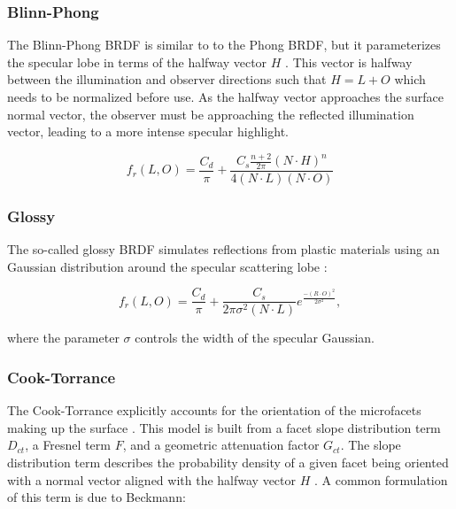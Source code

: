 \subsubsection{Blinn-Phong}

The Blinn-Phong BRDF is similar to to the Phong BRDF, but it parameterizes the specular lobe in terms of the halfway vector $H$ \cite{duvenhage2013}. This vector is halfway between the illumination and observer directions such that $H = L + O$ which needs to be normalized before use. As the halfway vector approaches the surface normal vector, the observer must be approaching the reflected illumination vector, leading to a more intense specular highlight. 

\begin{equation} \label{eq:brdf_blinn_phong}
  f_r(L, O) = \frac{C_d}{\pi} + \frac{C_s \frac{n+2}{2\pi} (N \cdot H)^n}{4 (N \cdot L)(N \cdot O)}
\end{equation}

\subsubsection{Glossy}

The so-called glossy BRDF simulates reflections from plastic materials using an Gaussian distribution around the specular scattering lobe \cite{duvenhage2013}:

\begin{equation} \label{eq:brdf_glossy}
  f_r(L, O) = \frac{C_d}{\pi} + \frac{C_s}{2\pi \sigma^2 \left(N \cdot L\right)}  e^{\frac{-\left( R \cdot O \right)^2}{2\sigma^2}},
\end{equation}

where the parameter $\sigma$ controls the width of the specular Gaussian.

\subsubsection{Cook-Torrance}

The Cook-Torrance explicitly accounts for the orientation of the microfacets making up the surface \cite{cook1982}. This model is built from a facet slope distribution term $D_{ct}$, a Fresnel term $F$, and a geometric attenuation factor $G_{ct}$. The slope distribution term describes the probability density of a given facet being oriented with a normal vector aligned with the halfway vector $H$ \cite{cook1982}. A common formulation of this term is due to Beckmann:

